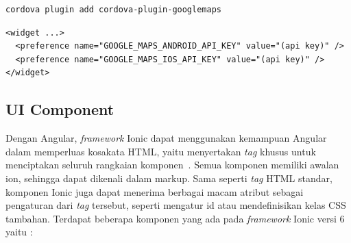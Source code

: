 \begin{lstlisting}[label={lst:installGMapsCordova}, caption=Kode untuk Menginstal \textit{Plugin} Cordova Google Maps]
cordova plugin add cordova-plugin-googlemaps
\end{lstlisting} 

\begin{lstlisting}[label={lst:apikeyGMapsCordova}, caption=Kode untuk Mengatur API Key untuk \textit{Plugin} Cordova Google Maps]
<widget ...>
  <preference name="GOOGLE_MAPS_ANDROID_API_KEY" value="(api key)" />
  <preference name="GOOGLE_MAPS_IOS_API_KEY" value="(api key)" />
</widget>
\end{lstlisting} 

\subsection{UI Component}
\label{subsec:uiComponent}
Dengan Angular, {\it framework} Ionic dapat menggunakan kemampuan Angular dalam memperluas kosakata HTML, yaitu menyertakan {\it tag} khusus untuk menciptakan seluruh rangkaian komponen~\cite{griffith:17:mobile}. Semua komponen memiliki awalan ion, sehingga dapat dikenali dalam markup. Sama seperti {\it tag} HTML standar, komponen Ionic juga dapat menerima berbagai macam atribut sebagai pengaturan dari {\it tag} tersebut, seperti mengatur id atau mendefinisikan kelas CSS tambahan. Terdapat beberapa komponen yang ada pada {\it framework} Ionic versi 6 yaitu :
